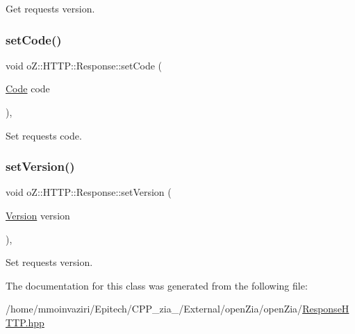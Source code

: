 Get request\textquotesingle{}s version. 

\mbox{\label{classo_z_1_1_h_t_t_p_1_1_response_a87d7f7da3ff4de61d1ead1a7d336dfa8}} 
\subsubsection{\texorpdfstring{setCode()}{setCode()}}
{\footnotesize\ttfamily void o\+Z\+::\+H\+T\+T\+P\+::\+Response\+::set\+Code (\begin{DoxyParamCaption}\item[{\mbox{\hyperlink{namespaceo_z_1_1_h_t_t_p_acd43703151305f79b1e2f42e98ee8199}{Code}}}]{code }\end{DoxyParamCaption})\hspace{0.3cm}{\ttfamily [inline]}, {\ttfamily [noexcept]}}



Set request\textquotesingle{}s code. 

\mbox{\label{classo_z_1_1_h_t_t_p_1_1_response_a676c9d140574b68e28120b827187b06a}} 
\subsubsection{\texorpdfstring{setVersion()}{setVersion()}}
{\footnotesize\ttfamily void o\+Z\+::\+H\+T\+T\+P\+::\+Response\+::set\+Version (\begin{DoxyParamCaption}\item[{\mbox{\hyperlink{structo_z_1_1_h_t_t_p_1_1_version}{Version}}}]{version }\end{DoxyParamCaption})\hspace{0.3cm}{\ttfamily [inline]}, {\ttfamily [noexcept]}}



Set request\textquotesingle{}s version. 



The documentation for this class was generated from the following file\+:\begin{DoxyCompactItemize}
\item 
/home/mmoinvaziri/\+Epitech/\+C\+P\+P\+\_\+zia\+\_/\+External/open\+Zia/open\+Zia/\mbox{\hyperlink{_response_h_t_t_p_8hpp}{Response\+H\+T\+T\+P.\+hpp}}\end{DoxyCompactItemize}
